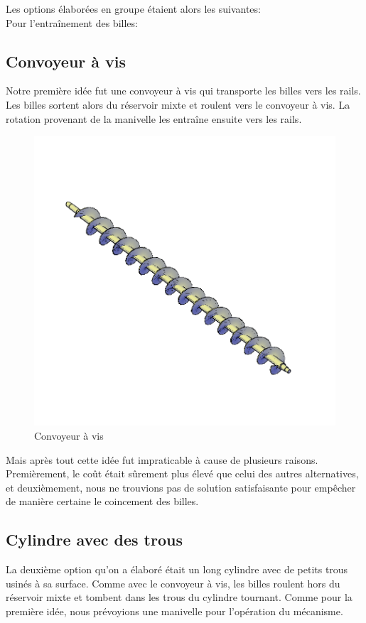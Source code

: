 Les options élaborées en groupe étaient alors les suivantes:\\
Pour l'entraînement des billes:

\subsection{Convoyeur à vis}
Notre première idée fut une convoyeur à vis qui transporte les billes vers les rails. Les billes sortent alors du réservoir mixte et roulent vers le convoyeur à vis. La rotation provenant de la manivelle les entraîne ensuite vers les rails.

\begin{figure}
    \centering
    \includegraphics[width=\textwidth]{Graphics/Images_concepts_Leon/795-Screw_conveyor.png}
    \caption{Convoyeur à vis}
\end{figure}

Mais après tout cette idée fut impraticable à cause de plusieurs raisons. Premièrement, le coût était sûrement plus élevé que celui des autres alternatives, et deuxièmement, nous ne trouvions pas de solution satisfaisante pour empêcher de manière certaine le coincement des billes.

\subsection{Cylindre avec des trous}
La deuxième option qu'on a élaboré était un long cylindre avec de petits trous usinés à sa surface. Comme avec le convoyeur à vis, les billes roulent hors du réservoir mixte et tombent dans les trous du cylindre tournant. Comme pour la première idée, nous prévoyions une manivelle pour l'opération du mécanisme.

